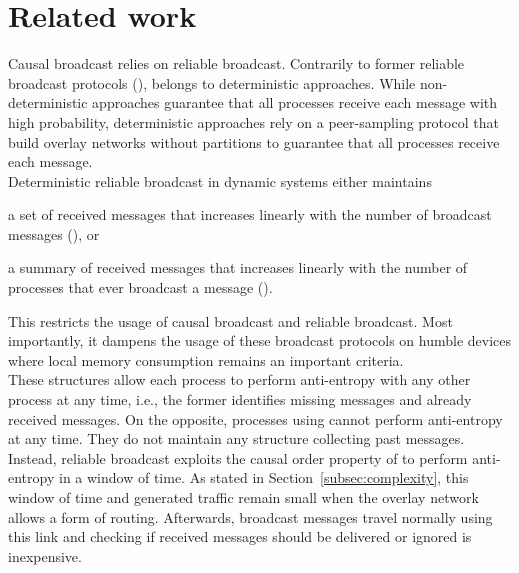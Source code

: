 
\section{Related work}
\label{sec:relatedwork}





Causal broadcast relies on reliable broadcast. 
Contrarily to former reliable broadcast protocols (\REF), \RPCBROADCAST belongs
to deterministic approaches. While non-deterministic approaches guarantee that
all processes receive each message with high probability, deterministic
approaches rely on a peer-sampling protocol that build overlay networks without
partitions to guarantee that all processes receive each message. \\
Deterministic reliable broadcast in dynamic systems either maintains
\begin{inparaenum}[(i)]
\item a set of received messages that increases linearly with the number of
  broadcast messages (\REF), or
\item a summary of received messages that increases linearly with the number of
  processes that ever broadcast a message (\REF). 
\end{inparaenum}
This restricts the usage of causal broadcast and reliable broadcast. Most
importantly, it dampens the usage of these broadcast protocols on humble devices
where local memory consumption remains an important criteria. \\
These structures allow each process to perform anti-entropy with any other
process at any time, i.e., the former identifies missing messages and already
received messages. On the opposite, processes using \RPCBROADCAST cannot perform
anti-entropy at any time. They do not maintain any structure collecting past
messages. Instead, reliable broadcast exploits the causal order property of
\RPCBROADCAST to perform anti-entropy in a window of time. As stated in
Section~\ref{subsec:complexity}, this window of time and generated traffic
remain small when the overlay network allows a form of routing. Afterwards,
broadcast messages travel normally using this link and checking if received
messages should be delivered or ignored is inexpensive.

